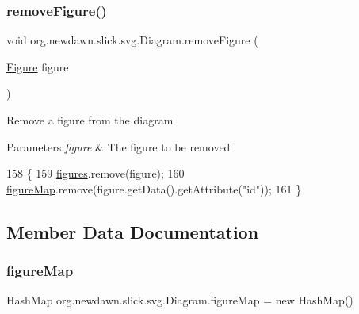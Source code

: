 \subsubsection{\texorpdfstring{remove\+Figure()}{removeFigure()}}
{\footnotesize\ttfamily void org.\+newdawn.\+slick.\+svg.\+Diagram.\+remove\+Figure (\begin{DoxyParamCaption}\item[{\mbox{\hyperlink{classorg_1_1newdawn_1_1slick_1_1svg_1_1_figure}{Figure}}}]{figure }\end{DoxyParamCaption})\hspace{0.3cm}{\ttfamily [inline]}}

Remove a figure from the diagram


\begin{DoxyParams}{Parameters}
{\em figure} & The figure to be removed \\
\hline
\end{DoxyParams}

\begin{DoxyCode}
158                                             \{
159         \mbox{\hyperlink{classorg_1_1newdawn_1_1slick_1_1svg_1_1_diagram_aaddbe68bc0b0c847583aa35d530aba2f}{figures}}.remove(figure);
160         \mbox{\hyperlink{classorg_1_1newdawn_1_1slick_1_1svg_1_1_diagram_a71c079c584be2e55632123b9b2d939ad}{figureMap}}.remove(figure.getData().getAttribute(\textcolor{stringliteral}{"id"}));
161     \}
\end{DoxyCode}


\subsection{Member Data Documentation}
\mbox{\label{classorg_1_1newdawn_1_1slick_1_1svg_1_1_diagram_a71c079c584be2e55632123b9b2d939ad}} 
\subsubsection{\texorpdfstring{figure\+Map}{figureMap}}
{\footnotesize\ttfamily Hash\+Map org.\+newdawn.\+slick.\+svg.\+Diagram.\+figure\+Map = new Hash\+Map()\hspace{0.3cm}{\ttfamily [private]}}

